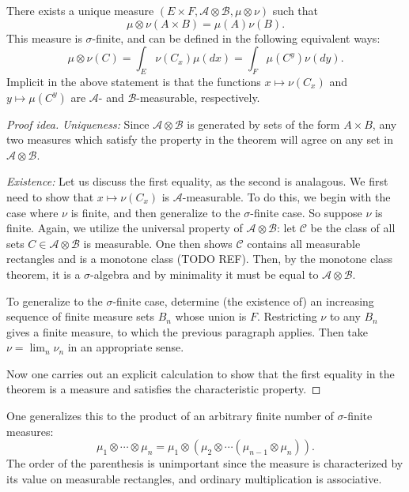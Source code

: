 \documentclass[12pt]{article}
\begin{document}
\begin{theorem}[]
	There exists a unique measure $(E\times F,\mathcal{A}\otimes\mathcal{B}, \mu\otimes\nu)$ such that 
	\begin{equation*}
		\mu\otimes\nu(A\times B)=\mu(A)\nu(B).
	\end{equation*}
	This measure is $\sigma$-finite, and can be defined in the following equivalent ways:
	\begin{equation*}
		\mu\otimes\nu(C)= \int_E \nu(C_x)\mu(dx) = \int_F \mu(C^y)\nu(dy).
	\end{equation*}
	Implicit in the above statement is that the functions $x\mapsto \nu(C_x)$ and $y\mapsto\mu(C^y)$ are $\mathcal{A}$- and $\mathcal{B}$-measurable, respectively.
\end{theorem}
\begin{proof}[Proof idea]
	\textit{Uniqueness:} Since $\mathcal{A}\otimes\mathcal{B}$ is generated by sets of the form $A\times B$, any two measures which satisfy the property in the theorem will agree on any set in $\mathcal{A}\otimes\mathcal{B}$.

	\textit{Existence:} Let us discuss the first equality, as the second is analagous. We first need to show that $x\mapsto \nu(C_x)$ is $\mathcal{A}$-measurable. To do this, we begin with the case where $\nu$ is finite, and then generalize to the $\sigma$-finite case. So suppose $\nu$ is finite. Again, we utilize the universal property of $\mathcal{A}\otimes\mathcal{B}$: let $\mathcal{C}$ be the class of all sets $C\in\mathcal{A}\otimes\mathcal{B}$ is measurable. One then shows $\mathcal{C}$ contains all measurable rectangles and is a monotone class (TODO REF). Then, by the monotone class theorem, it is a $\sigma$-algebra and by minimality it must be equal to $\mathcal{A}\otimes\mathcal{B}$.

	To generalize to the $\sigma$-finite case, determine (the existence of) an increasing sequence of finite measure sets $B_n$ whose union is $F$. Restricting $\nu$ to any $B_n$ gives a finite measure, to which the previous paragraph applies. Then take $\nu=\lim_n \nu_n$ in an appropriate sense.

	Now one carries out an explicit calculation to show that the first equality in the theorem is a measure and satisfies the characteristic property.
\end{proof}

\begin{remark}[]
	One generalizes this to the product of an arbitrary finite number of $\sigma$-finite measures:
	\begin{equation*}
		\mu_1\otimes\cdots\otimes \mu_n = \mu_1 \otimes (\mu_2 \otimes \cdots (\mu_{n-1}\otimes \mu_n)).
	\end{equation*}
	The order of the parenthesis is unimportant since the measure is characterized by its value on measurable rectangles,
	and ordinary multiplication is associative.
\end{remark}
\end{document}
